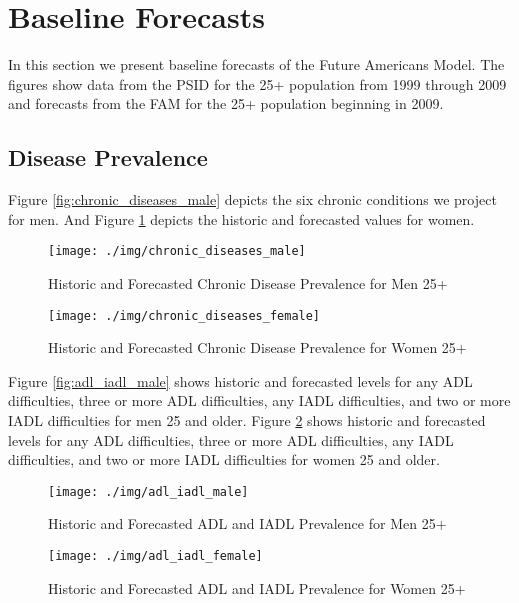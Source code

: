 \section{Baseline Forecasts}
In this section we present baseline forecasts of the Future Americans Model.  The figures show data from the PSID for the 25+ population from 1999 through 2009 and 
forecasts from the FAM for the 25+ population beginning in 2009.

\subsection{Disease Prevalence}
Figure \ref{fig:chronic_diseases_male} depicts the six chronic conditions we project for men.  And Figure \ref{fig:chronic_diseases_female} depicts the historic 
and forecasted values for women.

\begin{figure}[ht!]
\centering

\texttt{[image: ./img/chronic\_diseases\_male]}
\caption{Historic and Forecasted Chronic Disease Prevalence for Men 25+}
\label{fig:chronic_diseases_male} 

\texttt{[image: ./img/chronic\_diseases\_female]}
\caption{Historic and Forecasted Chronic Disease Prevalence for Women 25+}
\label{fig:chronic_diseases_female} 
\end{figure}

Figure \ref{fig:adl_iadl_male} shows historic and forecasted levels for any ADL difficulties, three or more ADL difficulties, any IADL difficulties, and
two or more IADL difficulties for men 25 and older. Figure \ref{fig:adl_iadl_female} shows historic and forecasted levels for any ADL difficulties, three or 
more ADL difficulties, any IADL difficulties, and two or more IADL difficulties for women 25 and older.

\begin{figure}[ht!]
\centering

\texttt{[image: ./img/adl\_iadl\_male]}
\caption{Historic and Forecasted ADL and IADL Prevalence for Men 25+}
\label{fig:adl_iadl_male} 

\texttt{[image: ./img/adl\_iadl\_female]}
\caption{Historic and Forecasted ADL and IADL Prevalence for Women 25+}
\label{fig:adl_iadl_female} 
\end{figure}
